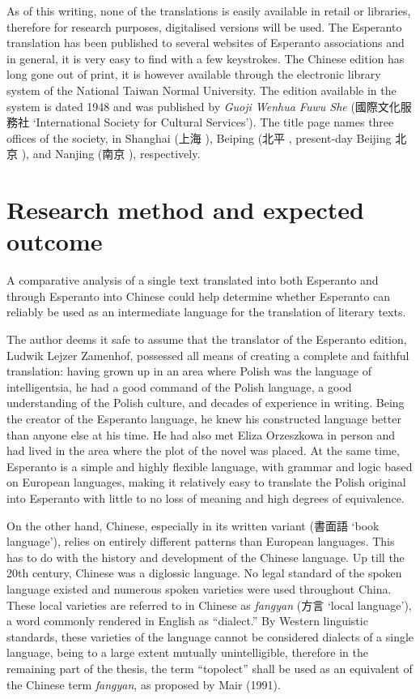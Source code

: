 As of this writing, none of the translations is easily available in retail or libraries, therefore for research purposes, digitalised versions will be used.
The Esperanto translation has been published to several websites of Esperanto associations and in general, it is very easy to find with a few keystrokes.
The Chinese edition has long gone out of print, it is however available through the electronic library system of the National Taiwan Normal University.
The edition available in the system is dated 1948 and was published by \textit{Guoji Wenhua Fuwu She} (國際文化服務社  `International Society for Cultural Services').
The title page names three offices of the society, in Shanghai (上海 ), Beiping (北平 , present-day Beijing 北京 ), and Nanjing (南京 ), respectively.

\section{Research method and expected outcome}

A comparative analysis of a single text translated into both Esperanto and through Esperanto into Chinese could help determine whether Esperanto can reliably be used as an intermediate language for the translation of literary texts.

The author deems it safe to assume that the translator of the Esperanto edition, Ludwik Lejzer Zamenhof, possessed all means of creating a complete and faithful translation: having grown up in an area where Polish was the language of intelligentsia, he had a good command of the Polish language, a good understanding of the Polish culture, and decades of experience in writing.
Being the creator of the Esperanto language, he knew his constructed language better than anyone else at his time.
He had also met Eliza Orzeszkowa in person and had lived in the area where the plot of the novel was placed.
At the same time, Esperanto is a simple and highly flexible language, with grammar and logic based on European languages, making it relatively easy to translate the Polish original into Esperanto with little to no loss of meaning and high degrees of equivalence.

On the other hand, Chinese, especially in its written variant (書面語  `book language'), relies on entirely different patterns than European languages.
This has to do with the history and development of the Chinese language.
Up till the 20th century, Chinese was a diglossic language.
No legal standard of the spoken language existed and numerous spoken varieties were used throughout China.
These local varieties are referred to in Chinese as \textit{fangyan} (方言  `local language'), a word commonly rendered in English as ``dialect.''
By Western linguistic standards, these varieties of the language cannot be considered dialects of a single language, being to a large extent mutually unintelligible, therefore in the remaining part of the thesis, the term ``topolect'' shall be used as an equivalent of the Chinese term \textit{fangyan}, as proposed by Mair (1991).

